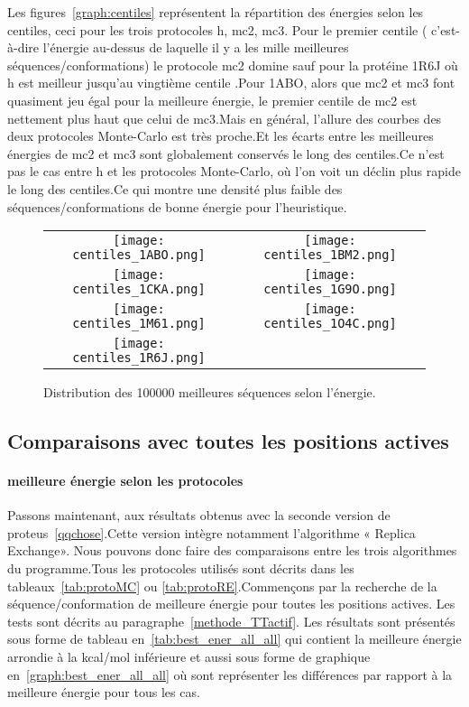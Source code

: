 Les figures~\ref{graph:centiles} représentent la répartition des énergies selon les centiles, ceci pour les trois protocoles h, mc2, mc3. Pour le premier centile  ( c'est-à-dire l'énergie au-dessus de laquelle il y a les mille meilleures séquences/conformations) le protocole mc2 domine sauf pour la protéine 1R6J où h est meilleur jusqu'au vingtième centile .Pour 1ABO, alors que mc2 et mc3 font quasiment jeu égal pour la meilleure énergie, le premier centile de mc2 est nettement plus haut que celui de mc3.Mais en général, l'allure des courbes des deux protocoles Monte-Carlo est très proche.Et les écarts entre  les meilleures énergies de mc2 et mc3 sont globalement conservés le long des centiles.Ce n'est pas le cas entre h et les protocoles Monte-Carlo, où l'on voit un déclin plus rapide le long des centiles.Ce qui montre une densité plus faible des séquences/conformations de bonne énergie pour l'heuristique. 


   \begin{figure}[t]
     \centering
     \begin{tabular}{cc}
       \texttt{[image: centiles\_1ABO.png]} &
       \texttt{[image: centiles\_1BM2.png]} \\
       \texttt{[image: centiles\_1CKA.png]} &
       \texttt{[image: centiles\_1G9O.png]} \\
       \texttt{[image: centiles\_1M61.png]} &
       \texttt{[image: centiles\_1O4C.png]} \\
       \texttt{[image: centiles\_1R6J.png]} \\
     \end{tabular}
     
     \caption{Distribution des 100000 meilleures séquences selon l'énergie.}
\label{grah:centiles}
   \end{figure}
 
\clearpage

\subsection{Comparaisons avec toutes les positions actives}


\paragraph{meilleure énergie selon les protocoles}
Passons maintenant, aux résultats obtenus avec la seconde version de proteus~\ref{qqchose}.Cette version intègre notamment l'algorithme « Replica Exchange». Nous pouvons donc faire des comparaisons entre les trois algorithmes du programme.Tous les protocoles utilisés sont décrits dans les tableaux~\ref{tab:protoMC} ou \ref{tab:protoRE}.Commençons par la recherche de la séquence/conformation de meilleure énergie pour toutes les positions actives. Les tests sont décrits au paragraphe~\ref{methode_TTactif}. Les résultats sont présentés sous forme de tableau en~\ref{tab:best_ener_all_all} qui contient la meilleure énergie arrondie à la kcal/mol inférieure et aussi sous forme de graphique en~\ref{graph:best_ener_all_all} où sont représenter les différences par rapport à la meilleure énergie pour tous les cas. 

